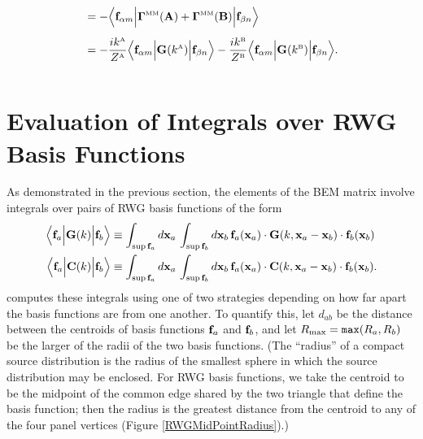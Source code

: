 \documentclass[letterpaper]{article}
\begin{document}
\begin{enumerate}
\begin{align*}
 &= -\Big\langle \mathbf{f}_{\alpha m} 
    \Big| \boldsymbol{\Gamma}^{\hbox{\tiny{MM}}}(\mathbf{A}) + \boldsymbol{\Gamma}^{\hbox{\tiny{MM}}}(\mathbf{B}) \Big|
                \mathbf{f}_{\beta n} 
    \Big\rangle
\\[5pt]
 &= -\frac{ik^{\hbox{\tiny{A}}}}{Z^{\hbox{\tiny{A}}}}
    \Big\langle \mathbf{f}_{\alpha m} 
                 \Big| \mathbf{G}(k^{\hbox{\tiny{A}}}) \Big|
                 \mathbf{f}_{\beta n} 
    \Big\rangle
    -
    \frac{ik^{\hbox{\tiny{B}}}}{Z^{\hbox{\tiny{B}}}}
    \Big\langle \mathbf{f}_{\alpha m} 
                 \Big| \mathbf{G}(k^{\hbox{\tiny{B}}}) \Big|
                 \mathbf{f}_{\beta n}
    \Big\rangle.
\\[10pt]
\end{align*}
\end{enumerate}

\newpage
\section{Evaluation of Integrals over RWG Basis Functions}

As demonstrated in the previous section, the elements of the 
BEM matrix involve integrals over pairs of RWG basis functions 
of the form
\begin{subequations}
\begin{align}
 \Big\langle \mathbf{f}_a \Big| \mathbf{G}(k) \Big | \mathbf{f}_b \Big \rangle
&\equiv 
  \int_{\sup \mathbf{f}_a} d\mathbf{x}_a \, 
  \int_{\sup \mathbf{f}_b} d\mathbf{x}_b\,
  \mathbf{f}_a(\mathbf{x}_a) \cdot 
  \mathbf{G}(k, \mathbf{x}_a-\mathbf{x}_b) \cdot 
  \mathbf{f}_b(\mathbf{x}_b)
\\
 \Big\langle \mathbf{f}_a \Big| \mathbf{C}(k) \Big | \mathbf{f}_b \Big \rangle
&\equiv 
  \int_{\sup \mathbf{f}_a} d\mathbf{x}_a \, 
  \int_{\sup \mathbf{f}_b} d\mathbf{x}_b \,
  \mathbf{f}_a(\mathbf{x}_a) \cdot 
  \mathbf{C}(k, \mathbf{x}_a-\mathbf{x}_b) \cdot 
  \mathbf{f}_b(\mathbf{x}_b).
\end{align}
\label{MatrixElementIntegrals}
\end{subequations}
\lss computes these integrals using one of two strategies depending
on how far apart the basis functions are from one another. To 
quantify this, let $d_{ab}$ be the distance between the centroids
of basis functions $\mathbf{f}_a$ and $\mathbf{f}_b$, and let 
$R_{\hbox{\scriptsize{max}}}=\texttt{max}(R_a, R_b)$ be the larger of the radii
of the two basis functions. (The ``radius'' of a compact source distribution
is the radius of the smallest sphere in which the source distribution
may be enclosed. For RWG basis functions, we take the centroid to be
the midpoint of the common edge shared by the two triangle that define
the basis function; then the radius is the greatest distance from the 
centroid to any of the four panel vertices 
(Figure \ref{RWGMidPointRadius}).)
\end{document}
